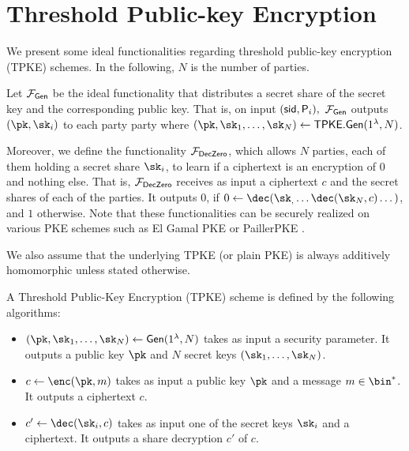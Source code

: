 \section{Threshold Public-key Encryption}
\label{subsec:TPKE}
We present  some ideal functionalities regarding threshold public-key encryption (TPKE) schemes. In the following, $N$ is the number of parties. 

Let   $\mathcal{F}_\mathsf{Gen}$ be the ideal functionality that distributes a secret share of the secret key and the corresponding public key. That is, on input $(\mathsf{sid},\mathsf{P}_i),$ $\mathcal{F}_\mathsf{Gen}$ outputs $(\pk,\sk_i)$ to each party party where $(\pk,\sk_1,\dots, \sk_N)\leftarrow\mathsf{TPKE.Gen}(1^\lambda,N)$.

Moreover, we define the functionality $\mathcal{F}_{\mathsf{DecZero}}$, which allows $N$ parties, each of them holding a secret share $\sk_i$, to learn if a ciphertext is an encryption of $0$ and nothing else. That is, $\mathcal{F}_{\mathsf{DecZero}}$ receives as input a ciphertext $c$ and the secret shares of each of the parties. It outputs $0$, if $0\leftarrow\dec(\sk_,\dots \dec(\sk_N,c)\dots)$, and $1$ otherwise. Note that these functionalities can be securely realized on various PKE schemes such as El Gamal  PKE or Pailler\footnotemark PKE \cite{PKC:HazVen17}.


We also assume that the underlying TPKE (or plain PKE) is always additively homomorphic unless stated otherwise.


\begin{definition}
A Threshold Public-Key Encryption (TPKE) scheme is defined by the following algorithms:
\begin{itemize}
    \item $(\pk,\sk_1,\dots, \sk_N)\leftarrow \mathsf{Gen}(1^\lambda,N)$ takes as input a security parameter. It outputs a public key $\pk$ and $N$ secret keys $(\sk_1,\dots, \sk_N)$.
    \item $c\leftarrow \enc(\pk,m)$ takes as input a public key $\pk$ and a message $m\in\bin^*$. It outputs a ciphertext $c$.
    \item $c'\leftarrow \dec(\sk_i,c)$ takes as input one of the secret keys $\sk_i$ and a ciphertext. It outputs a share decryption $c'$ of $c$.
\end{itemize}{}
\end{definition}{}


